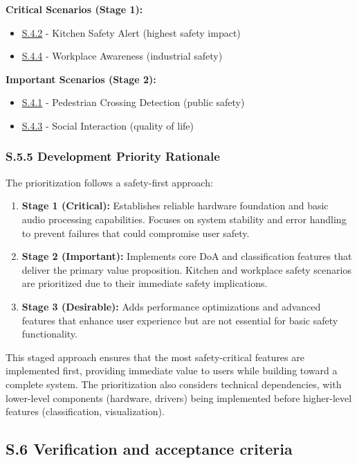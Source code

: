 \documentclass[12pt]{article}
\theoremstyle{definition}
\begin{document}
\textbf{Critical Scenarios (Stage 1):}
\begin{itemize}
    \item \hyperref[S.4.2]{S.4.2} - Kitchen Safety Alert (highest safety impact)
    \item \hyperref[S.4.4]{S.4.4} - Workplace Awareness (industrial safety)
\end{itemize}

\textbf{Important Scenarios (Stage 2):}
\begin{itemize}
    \item \hyperref[S.4.1]{S.4.1} - Pedestrian Crossing Detection (public safety)
    \item \hyperref[S.4.3]{S.4.3} - Social Interaction (quality of life)
\end{itemize}

\subsubsection{S.5.5 Development Priority Rationale}

The prioritization follows a safety-first approach:

\begin{enumerate}
    \item \textbf{Stage 1 (Critical):} Establishes reliable hardware foundation and basic audio processing capabilities. Focuses on system stability and error handling to prevent failures that could compromise user safety.
    
    \item \textbf{Stage 2 (Important):} Implements core DoA and classification features that deliver the primary value proposition. Kitchen and workplace safety scenarios are prioritized due to their immediate safety implications.
    
    \item \textbf{Stage 3 (Desirable):} Adds performance optimizations and advanced features that enhance user experience but are not essential for basic safety functionality.
\end{enumerate}

This staged approach ensures that the most safety-critical features are implemented first, providing immediate value to users while building toward a complete system. The prioritization also considers technical dependencies, with lower-level components (hardware, drivers) being implemented before higher-level features (classification, visualization).

\subsection{S.6 Verification and acceptance criteria}
\end{document}
